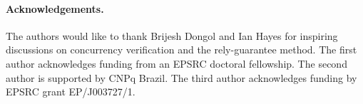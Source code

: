 \documentclass{llncs}
\begin{document}
\paragraph*{Acknowledgements.} The authors would like to thank Brijesh
Dongol and Ian Hayes for inspiring discussions on concurrency
verification and the rely-guarantee method. The first author
acknowledges funding from an EPSRC doctoral fellowship. The second
author is supported by CNPq Brazil. The third
author acknowledges funding by EPSRC grant EP/J003727/1.

{}

\end{document}
